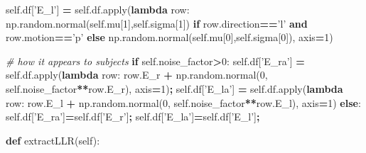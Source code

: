\documentclass[12pt,twoside]{reedthesis}
\newenvironment{Shaded}{\begin{snugshade}}{\end{snugshade}}
\newcommand{\BuiltInTok}[1]{#1}
\newcommand{\CommentTok}[1]{\textcolor[rgb]{0.56,0.35,0.01}{\textit{#1}}}
\newcommand{\ControlFlowTok}[1]{\textcolor[rgb]{0.13,0.29,0.53}{\textbf{#1}}}
\newcommand{\DecValTok}[1]{\textcolor[rgb]{0.00,0.00,0.81}{#1}}
\newcommand{\KeywordTok}[1]{\textcolor[rgb]{0.13,0.29,0.53}{\textbf{#1}}}
\newcommand{\NormalTok}[1]{#1}
\newcommand{\OperatorTok}[1]{\textcolor[rgb]{0.81,0.36,0.00}{\textbf{#1}}}
\newcommand{\StringTok}[1]{\textcolor[rgb]{0.31,0.60,0.02}{#1}}
\newcommand{\VariableTok}[1]{\textcolor[rgb]{0.00,0.00,0.00}{#1}}
\begin{document}
\begin{Shaded}
\begin{Highlighting}[]
        \VariableTok{self}\NormalTok{.df[}\StringTok{'E_l'}\NormalTok{] }\OperatorTok{=} \VariableTok{self}\NormalTok{.df.}\BuiltInTok{apply}\NormalTok{(}\KeywordTok{lambda}\NormalTok{ row: }
\NormalTok{               np.random.normal(}\VariableTok{self}\NormalTok{.mu[}\DecValTok{1}\NormalTok{],}\VariableTok{self}\NormalTok{.sigma[}\DecValTok{1}\NormalTok{]) }
               \ControlFlowTok{if}\NormalTok{ row.direction}\OperatorTok{==}\StringTok{'l'} \KeywordTok{and}\NormalTok{ row.motion}\OperatorTok{==}\StringTok{'p'}
               \ControlFlowTok{else}\NormalTok{ np.random.normal(}\VariableTok{self}\NormalTok{.mu[}\DecValTok{0}\NormalTok{],}\VariableTok{self}\NormalTok{.sigma[}\DecValTok{0}\NormalTok{]),}
\NormalTok{               axis}\OperatorTok{=}\DecValTok{1}\NormalTok{)}
       
        \CommentTok{# how it appears to subjects}
        \ControlFlowTok{if} \VariableTok{self}\NormalTok{.noise_factor}\OperatorTok{>}\DecValTok{0}\NormalTok{:}
          \VariableTok{self}\NormalTok{.df[}\StringTok{'E_ra'}\NormalTok{] }\OperatorTok{=} \VariableTok{self}\NormalTok{.df.}\BuiltInTok{apply}\NormalTok{(}\KeywordTok{lambda}\NormalTok{ row: row.E_r }\OperatorTok{+}
\NormalTok{                 np.random.normal(}\DecValTok{0}\NormalTok{, }\VariableTok{self}\NormalTok{.noise_factor}\OperatorTok{**}\NormalTok{row.E_r), }
\NormalTok{                 axis}\OperatorTok{=}\DecValTok{1}\NormalTok{)}\OperatorTok{;}
          \VariableTok{self}\NormalTok{.df[}\StringTok{'E_la'}\NormalTok{] }\OperatorTok{=} \VariableTok{self}\NormalTok{.df.}\BuiltInTok{apply}\NormalTok{(}\KeywordTok{lambda}\NormalTok{ row: row.E_l }\OperatorTok{+}
\NormalTok{                 np.random.normal(}\DecValTok{0}\NormalTok{, }\VariableTok{self}\NormalTok{.noise_factor}\OperatorTok{**}\NormalTok{row.E_l), }
\NormalTok{                 axis}\OperatorTok{=}\DecValTok{1}\NormalTok{)}
        \ControlFlowTok{else}\NormalTok{:}
          \VariableTok{self}\NormalTok{.df[}\StringTok{'E_ra'}\NormalTok{]}\OperatorTok{=}\VariableTok{self}\NormalTok{.df[}\StringTok{'E_r'}\NormalTok{]}\OperatorTok{;}
          \VariableTok{self}\NormalTok{.df[}\StringTok{'E_la'}\NormalTok{]}\OperatorTok{=}\VariableTok{self}\NormalTok{.df[}\StringTok{'E_l'}\NormalTok{]}\OperatorTok{;}
    
    \KeywordTok{def}\NormalTok{ extractLLR(}\VariableTok{self}\NormalTok{):}
        

\end{Highlighting}
\end{Shaded}
\end{document}
